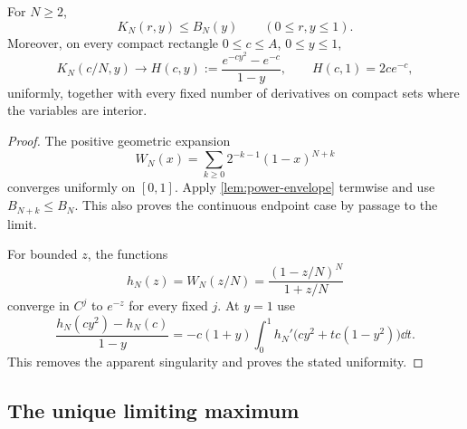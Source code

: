 \begin{lemma}\label{lem:kernel-scale}
For $N\ge2$,
\begin{equation}\label{eq:kernel-envelope}
 K_N(r,y)\le B_N(y)\qquad(0\le r,y\le1).
\end{equation}
Moreover, on every compact rectangle $0\le c\le A$, $0\le y\le1$,
\begin{equation}\label{eq:kernel-limit}
 K_N(c/N,y)\longrightarrow
 H(c,y):=\frac{e^{-cy^2}-e^{-c}}{1-y},\qquad H(c,1)=2ce^{-c},
\end{equation}
uniformly, together with every fixed number of derivatives on compact
sets where the variables are interior.
\end{lemma}
\begin{proof}
The positive geometric expansion
\[
 W_N(x)=\sum_{k\ge0}2^{-k-1}(1-x)^{N+k}
\]
converges uniformly on $[0,1]$. Apply \cref{lem:power-envelope}
termwise and use $B_{N+k}\le B_N$. This also proves the continuous
endpoint case by passage to the limit.

For bounded $z$, the functions
\[
 h_N(z)=W_N(z/N)=\frac{(1-z/N)^N}{1+z/N}
\]
converge in $C^j$ to $e^{-z}$ for every fixed $j$. At $y=1$ use
\[
 \frac{h_N(cy^2)-h_N(c)}{1-y}
 =-c(1+y)\int_0^1 h_N'\bigl(cy^2+t c(1-y^2)\bigr)\dd t.
\]
This removes the apparent singularity and proves the stated uniformity.
\end{proof}

\subsection{The unique limiting maximum}

